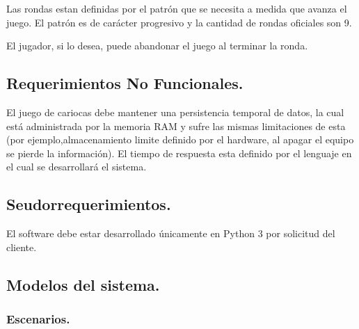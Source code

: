 \documentclass[60pt]{article}
\begin{document}
Las rondas estan definidas por el patrón que se necesita a medida que avanza el juego. El \gls{patrón} es de carácter progresivo y la cantidad de rondas oficiales son 9.

El jugador, si lo desea, puede abandonar el juego al terminar la ronda.
\subsection{Requerimientos No Funcionales.}\label{cap:requerimientos-no-funcionales}
El juego de cariocas debe mantener una persistencia temporal de datos, la cual está administrada por la memoria RAM y sufre las mismas limitaciones de esta (por ejemplo,almacenamiento limite definido por el hardware, al apagar el equipo se pierde la información).  El tiempo de respuesta esta definido por el lenguaje en el cual se desarrollará el sistema.

\subsection{Seudorrequerimientos.}\label{cap:seudorrequerimientos}
El software debe estar desarrollado únicamente en Python 3 por solicitud del cliente.
\subsection{Modelos del sistema.}\label{cap:modelos-sistema}

\subsubsection{Escenarios.}\label{cap:escenarios}
\end{document}
